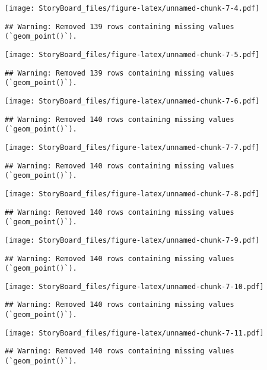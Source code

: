 \documentclass[
]{article}
\begin{document}
\texttt{[image: StoryBoard\_files/figure-latex/unnamed-chunk-7-4.pdf]}

\begin{verbatim}
## Warning: Removed 139 rows containing missing values (`geom_point()`).
\end{verbatim}

\texttt{[image: StoryBoard\_files/figure-latex/unnamed-chunk-7-5.pdf]}

\begin{verbatim}
## Warning: Removed 139 rows containing missing values (`geom_point()`).
\end{verbatim}

\texttt{[image: StoryBoard\_files/figure-latex/unnamed-chunk-7-6.pdf]}

\begin{verbatim}
## Warning: Removed 140 rows containing missing values (`geom_point()`).
\end{verbatim}

\texttt{[image: StoryBoard\_files/figure-latex/unnamed-chunk-7-7.pdf]}

\begin{verbatim}
## Warning: Removed 140 rows containing missing values (`geom_point()`).
\end{verbatim}

\texttt{[image: StoryBoard\_files/figure-latex/unnamed-chunk-7-8.pdf]}

\begin{verbatim}
## Warning: Removed 140 rows containing missing values (`geom_point()`).
\end{verbatim}

\texttt{[image: StoryBoard\_files/figure-latex/unnamed-chunk-7-9.pdf]}

\begin{verbatim}
## Warning: Removed 140 rows containing missing values (`geom_point()`).
\end{verbatim}

\texttt{[image: StoryBoard\_files/figure-latex/unnamed-chunk-7-10.pdf]}

\begin{verbatim}
## Warning: Removed 140 rows containing missing values (`geom_point()`).
\end{verbatim}

\texttt{[image: StoryBoard\_files/figure-latex/unnamed-chunk-7-11.pdf]}

\begin{verbatim}
## Warning: Removed 140 rows containing missing values (`geom_point()`).
\end{verbatim}
\end{document}
